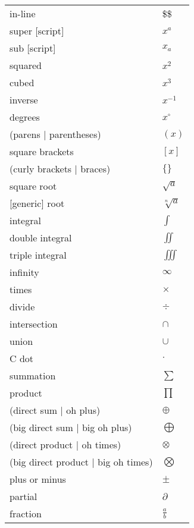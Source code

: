 \documentclass[12pt, a4paper]{article}
\begin{document}
\begin{longtable}{ll}
in-line & \$\$ \\
super [script] & $x^{a}$ \\
sub [script] & $x_{a}$ \\
squared & $x^{2} $ \\
cubed & $x^{3} $ \\
inverse & $x^{-1} $ \\
degrees & $x^{\circ}$ \\
(parens | parentheses) & $\left( x \right)$ \\
square brackets & $\left[ x \right] $ \\
(curly brackets | braces) & $\{  \}$ \\
square root & $\sqrt{a}$ \\
{[generic]} root & $\sqrt[n]{a}$ \\
integral & $\int$ \\
double integral & $\iint$ \\
triple integral & $\iiint$ \\
infinity & $\infty$ \\
times & $\times$ \\
divide & $\div$ \\
intersection & $\cap$ \\
union & $\cup$ \\
C dot & $\cdot$ \\
summation & $\sum$ \\
product & $\prod$ \\
(direct sum | oh plus) & $\oplus$ \\
(big direct sum | big oh plus) & $\bigoplus$ \\
(direct product | oh times) & $\otimes$ \\
(big direct product | big oh times) & $\bigotimes$ \\
plus or minus & $\pm$ \\
partial & $\partial$ \\
fraction & $\frac{a}{b}$ \\

\end{longtable}
\end{document}
